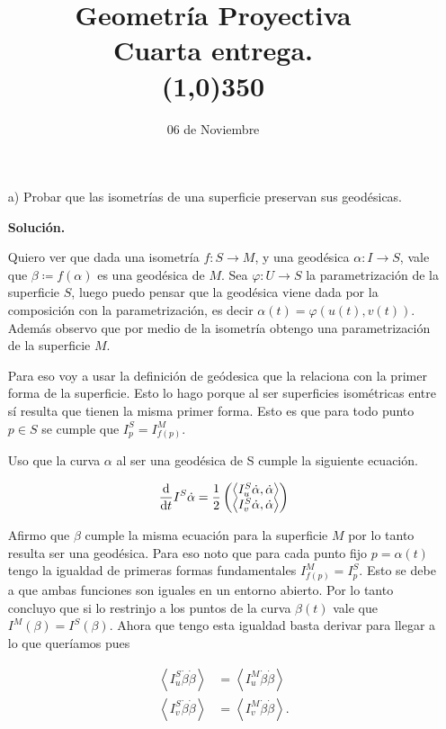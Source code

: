 \documentclass{article}
\title{Geometría Proyectiva \\ \large Cuarta entrega.  \\\line(1,0){350}}
\date{06 de Noviembre}
\begin{document}
	\maketitle
	\begin{itemize}
		\item[a)] Probar que las isometr\'ias de una superficie preservan sus geod\'esicas.
		
		\textbf{Solución.}
		
		Quiero ver que dada una isometría $f:S \to M$, y una geodésica $\alpha \colon I \to S$, vale que $\beta \coloneqq f(\alpha)$ es una geodésica de $M$. Sea $\varphi \colon U \to S$  la parametrización de la superficie $S$, luego puedo pensar que la geodésica viene dada por la composición con la parametrización, es decir $\alpha(t) = \varphi(u(t),v(t))$. Además observo que por medio de la isometría obtengo una parametrización de la superficie $M$.
		
		Para eso voy a usar la definición de geódesica que la relaciona con la primer forma de la superficie. Esto lo hago porque al ser superficies isométricas entre sí resulta que tienen la misma primer forma. Esto es que para todo punto $p \in S$ se cumple que $I^{S}_{p} = I^{M}_{f(p)}$. 
		
		Uso que la curva $\alpha$ al ser una geodésica de S cumple la siguiente ecuación.
		
		\begin{align*}
		\dv{}{t}I^{S}\dot \alpha = \frac{1}{2}  \begin{pmatrix}
		\left\langle I^{S}_{u}\dot\alpha, \dot\alpha \right\rangle \\
		\left\langle I^{S}_{v}\dot\alpha, \dot\alpha \right\rangle \\
		\end{pmatrix}
		\end{align*} 
		
		Afirmo que $\beta$ cumple la misma ecuación para la superficie $M$ por lo tanto resulta ser una geodésica. Para eso noto que para cada punto fijo $p=\alpha(t)$ tengo la igualdad de primeras formas fundamentales $I^{M}_{f(p)} = I^{S}_{p}$. Esto se debe a que ambas funciones son iguales en un entorno abierto. Por lo tanto concluyo que si lo restrinjo a los puntos de la curva $\beta(t)$ vale que $I^{M}(\beta) = I^{S}(\beta)$. Ahora que tengo esta igualdad basta derivar para llegar a lo que queríamos pues
		
		\begin{align*}
		\left\langle {I^S_u\dot \beta}{\dot\beta} \right\rangle &= \left\langle  {I^M_u\dot \beta}{\dot \beta} \right\rangle  \\
		\left\langle {I^S_v\dot \beta}{\dot \beta} \right\rangle &= \left\langle  {I^M_v\dot \beta}{\dot \beta} \right\rangle. 
		\end{align*}
		

\end{itemize}
\end{document}
